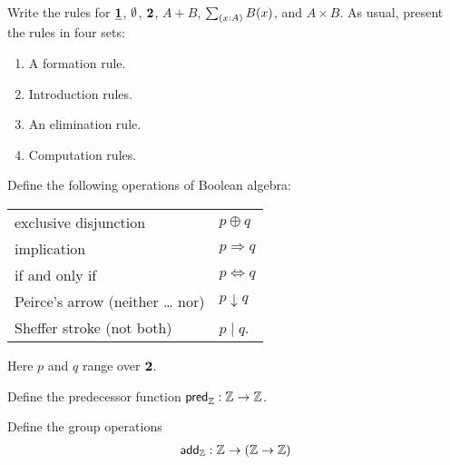 \begin{exercises}
\item
  Write the rules for $\underline{\mathbf{1}}$, $\emptyset$, $\mathbf{2}$, $A+B$, $\sm{x:A}B(x)$, and $A\times B$. As usual, present the rules in four sets:
  \begin{enumerate}
  \item A formation rule.
  \item Introduction rules.
  \item An elimination rule.
  \item Computation rules.
  \end{enumerate}
\item \label{ex:boolean-operation}Define the following operations of Boolean algebra:
  \begin{center}
    \begin{tabular}{ll}
      exclusive disjunction & $p \oplus q$ \\
      implication & $p \Rightarrow q$ \\
      if and only if & $p \Leftrightarrow q$ \\
      Peirce's arrow (neither \dots{} nor) & $p \downarrow q$ \\
      Sheffer stroke (not both) & $p\mid q$.
    \end{tabular}
  \end{center}
  Here $p$ and $q$ range over $\mathbf{2}$. 
\item \label{ex:int_pred}Define the predecessor function $\mathsf{pred}_{{\mathbb{Z}}}:{\mathbb{Z}}\to {\mathbb{Z}}$.
\item \label{ex:int_group_ops}Define the group operations
  \begin{align*}
    \addZ & : \Z \to (\Z \to \Z) \\

\end{align*}
\end{exercises}
